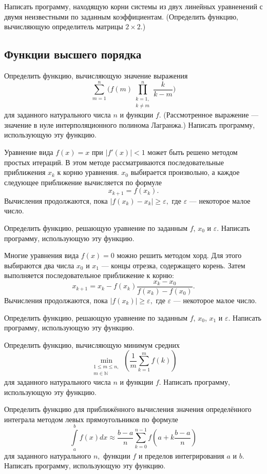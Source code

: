 \task Написать программу, находящую корни системы из двух линейных
уравненений с двумя неизвестными по заданным
коэффициентам. (Определить функцию, вычисляющую определитель матрицы
$2\times 2.$)


\subsection{Функции высшего порядка}

\task Определить функцию, вычисляющую значение выражения
\[
\sum_{m=1}^n\bigg(
f(m)
\prod_{\substack{k=1,\\k\neq m}}^n
\frac{k}{k-m}
\bigg)
\]
для заданного натурального числа $n$ и функции $f.$ (Рассмотренное
выражение — значение в нуле интерполяционного полинома Лагранжа.)
Написать программу, использующую эту функцию.

\task Уравнение вида $f(x)=x$ при $|f'(x)|<1$ может быть решено
методом простых итераций. В этом методе рассматриваются
последовательные приближения $x_k$ к корню уравнения. $x_0$ выбирается
произвольно, а каждое следующее приближение вычисляется по формуле
\[
x_{k+1} = f(x_k).
\]
Вычисления продолжаются, пока $|f(x_k) - x_k| \geqslant \varepsilon,$
где $\varepsilon$ — некоторое малое число.

Определить функцию, решающую уравнение по заданным $f$, $x_0$ и
$\varepsilon.$ Написать программу, использующую эту функцию.

\task Многие уравнения вида $f(x)=0$ можно решить методом хорд. Для
этого выбираются два числа $x_0$ и $x_1$ — концы отрезка, содержащего
корень. Затем выполняется последовательное приближение к корню:
\[
x_{k+1} = x_k - f(x_k)\frac{x_k - x_0}{f(x_k) - f(x_0)}.
\] 
Вычисления продолжаются, пока $|f(x_k)| \geqslant \varepsilon,$
где $\varepsilon$ — некоторое малое число.

Определить функцию, решающую уравнение по заданным $f$, $x_0$, $x_1$ и
$\varepsilon.$ Написать программу, использующую эту функцию.

\task Определить функцию, вычисляющую минимум средних
\[
\min_{\substack{1\leqslant m\leqslant n,\\ m\in\mathbb{N}}}
\left(
\frac{1}{m}\sum_{k=1}^{m} f(k)
\right)
\]
для заданного натурального числа $n$ и функции $f.$ Написать
программу, использующую эту функцию.

\task Определить функцию для приближённого вычисления значения
определённого интеграла методом левых прямоугольников по формуле
\[
\int\limits_a^b f(x) dx \approx
\frac{b-a}{n}\sum_{k=0}^{n-1} f \left(a + k\frac{b-a}{n}\right)
\]
для заданного натурального $n,$ функции $f$ и пределов интегрирования
$a$ и $b.$ Написать программу, использующую эту функцию.

